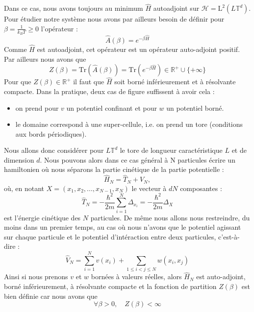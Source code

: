 \documentclass[11pt]{article}
\newcommand{\hham}{\hat{H}}
\newcommand{\dom}{L\mathbb{T}^d}
\begin{document}
Dans ce cas, nous avons toujours au minimum $\hham$ autoadjoint sur $\mathcal{H}=\mathrm{L}^2(\dom)$. Pour étudier notre système nous avons par ailleurs besoin de définir pour $\beta = \frac{1}{k_BT}\geq 0$ l'opérateur :
\begin{equation}
\hat{A}(\beta)=e^{-\beta \hham}
\end{equation} 
Comme $\hham$ est autoadjoint, cet opérateur est un opérateur auto-adjoint positif. Par ailleurs nous avons que 
\begin{equation}
Z(\beta)=\mathrm{Tr}(\hat{A}(\beta))=\mathrm{Tr}(e^{-\beta \hham})\in \mathbb{R}^+\cup \lbrace+\infty\rbrace
\end{equation}
Pour que $Z(\beta)\in\mathbb{R}^+$ il faut que $\hham$ soit borné inférieurement et à résolvante compacte. Dans la pratique, deux cas de figure suffissent à avoir cela :
\begin{itemize}
\item on prend pour $v$ un potentiel confinant et pour $w$ un potentiel borné.
\item le domaine correspond à une super-cellule, i.e. on prend un tore (conditions aux bords périodiques).
\end{itemize}
Nous allons donc considérer pour $\dom$ le tore de longueur caractéristique $L$ et de dimension $d$.
Nous pouvons alors dans ce cas général à N particules écrire un hamiltonien où nous séparons la partie cinétique de la partie potentielle :
\begin{equation}
\hham_N=\hat{T}_N+\hat{V}_N ,
\end{equation}
où, en notant $X=(x_1,x_2,...,x_{N-1},x_N)$ le vecteur à $dN$ composantes : 
\begin{equation}
\hat{T}_N=-\frac{\hbar^2}{2m}\sum_{i=1}^{N}\Delta_{x_i}=-\frac{\hbar^2}{2m}\Delta_X
\end{equation}
est l'énergie cinétique des $N$ particules.
De même nous allons nous restreindre, du moins dans un premier temps, au cas où nous n'avons que le potentiel agissant sur chaque particule et le potentiel d'intéraction entre deux particules, c'est-à-dire : 
\begin{equation}
\hat{V}_N=\sum_{i=1}^N v(x_i)+\sum_{1\leq i < j \leq N} w(x_i,x_j)
\end{equation}
Ainsi si nous prenons $v$ et $w$ bornées à valeurs réelles, alors $\hham_N$ est auto-adjoint, borné inférieurement, à résolvante compacte et la fonction de partition $Z(\beta)$ est bien définie car nous avons que 
\begin{equation}
\forall \beta>0,\quad Z(\beta)<\infty
\end{equation}
\end{document}
